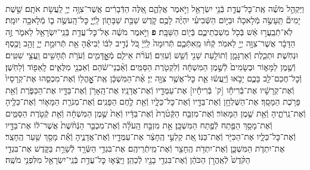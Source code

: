 \documentclass[twoside, openany, parskip=half, 11pt]{book}
\begin{document}
\begin{footnotesize}
\begin{multicols}{2}
\\
וַיַּקְהֵ֣ל מֹשֶׁ֗ה אֶֽת־כׇּל־עֲדַ֛ת בְּֿנֵ֥י יִשְׂרָאֵ֖ל וַיֹּ֣אמֶר אֲלֵהֶ֑ם אֵ֚לֶּה הַדְּֿבָרִ֔ים אֲשֶׁר־צִוָּ֥ה יְיָ֖ לַֽעֲשׂ֥ת אֹתָֽם׃ שֵׁ֣שֶׁת יָמִים֘ תֵּֽעָשֶׂ֣ה מְֿלָאכָה֒ וּבַיּ֣וֹם הַשְּֿׁבִיעִ֗י יִהְיֶ֨ה לָכֶ֥ם קֹ֛דֶשׁ שַׁבַּ֥ת שַׁבָּת֖וֹן לַֽיְֿיָ֑ כׇּל־הָֽעֹשֶׂ֥ה ב֛וֹ מְֿלָאכָ֖ה יוּמָֽת׃ לֹֽא־תְֿבַֽעֲר֣וּ אֵ֔שׁ בְּֿכֹ֖ל מֽשְׁבֹֽתֵיכֶ֑ם בְּֿי֖וֹם הַשַּׁבָּֽת׃ \textbf{פ}
וַיֹּ֣אמֶר מֹשֶׁ֔ה אֶל־כׇּל־עֲדַ֥ת בְּֿנֵֽי־יִשְׂרָאֵ֖ל לֵאמֹ֑ר זֶ֣ה הַדָּבָ֔ר אֲשֶׁר־צִוָּ֥ה יְיָ֖ לֵאמֹֽר׃ קְֿח֨וּ מֵֽאִתְּֿכֶ֤ם תְּֿרוּמָה֙ לַֽיְֿיָ֔ כֹּ֚ל נְֿדִ֣יב לִבּ֔וֹ יְֿבִיאֶ֕הָ אֵ֖ת תְּֿרוּמַ֣ת יְיָ֑ זָהָ֥ב וָכֶ֖סֶף וּנְחֹֽשֶׁת׃ וּתְכֵ֧לֶת וְֿאַרְגָּמָ֛ן וְֿתוֹלַ֥עַת שָׁנִ֖י וְֿשֵׁ֥שׁ וְֿעִזִּֽים׃ וְֿעֹרֹ֨ת אֵילִ֧ם מְֿאׇׇׇׇׇׇָדָּמִ֛ים וְֿעֹרֹ֥ת תְּֿחָשִׁ֖ים וַֽעֲצֵ֥י שִׁטִּֽים׃ וְֿשֶׁ֖מֶן לַמָּא֑וֹר וּבְשָׂמִים֙ לְֿשֶׁ֣מֶן הַמִּשְׁחָ֔ה וְֿלִקְטֹ֖רֶת הַסַּמִּֽים׃ וְֿאַ֨בְנֵי־שֹׁ֔הַם וְֿאַבְנֵ֖י מִלֻּאִ֑ים לָֽאֵפ֖וֹד וְֿלַחֹֽשֶׁן׃ וְֿכׇל־חֲכַם־לֵ֖ב בָּכֶ֑ם יָבֹ֣אוּ וְֿיַֽעֲשׂ֔וּ אֵ֛ת כׇּל־אֲשֶׁ֥ר צִוָּ֖ה יְיָ׃
אֶ֨ת־הַמִּשְׁכָּ֔ן אֶֽת־אׇׇׇׇׇָֽהֳל֖וֹ וְֿאֶת־מִכְסֵ֑הוּ אֶת־קְרָסָיו֙ וְֿאֶת־קְרָשָׁ֔יו אֶת־בְּֿרִיחָ֕ו [ק' בְּֿרִיחָ֕יו] אֶת־עַמֻּדָ֖יו וְֿאֶת־אֲדָנָֽיו׃ אֶת־הָֽאָרֹ֥ן וְֿאֶת־בַּדָּ֖יו אֶת־הַכַּפֹּ֑רֶת וְֿאֵ֖ת פָּרֹ֥כֶת הַמָּסָֽךְ׃ אֶת־הַשֻּׁלְחָ֥ן וְֿאֶת־בַּדָּ֖יו וְֿאֶת־כׇּל־כֵּלָ֑יו וְֿאֵ֖ת לֶ֥חֶם הַפָּנִֽים׃ וְֿאֶת־מְנֹרַ֧ת הַמָּא֛וֹר וְֿאֶת־כֵּלֶ֖יהָ וְֿאֶת־נֵֽרֹתֶ֑יהָ וְֿאֵ֖ת שֶׁ֥מֶן הַמָּאֽוֹר׃ וְֿאֶת־מִזְבַּ֤ח הַקְּֿטֹ֨רֶת֙ וְֿאֶת־בַּדָּ֔יו וְֿאֵת֙ שֶׁ֣מֶן הַמִּשְׁחָ֔ה וְֿאֵ֖ת קְֿטֹ֣רֶת הַסַּמִּ֑ים וְֿאֶת־מָסַ֥ךְ הַפֶּ֖תַח לְֿפֶ֥תַח הַמִּשְׁכָּֽן׃ אֵ֣ת מִזְבַּ֣ח הָֽעֹלָ֗ה וְֿאֶת־מִכְבַּ֤ר הַנְּֿחֹ֨שֶׁת֙ אֲשֶׁר־ל֔וֹ אֶת־בַּדָּ֖יו וְֿאֶת־כׇּל־כֵּלָ֑יו אֶת־הַכִּיֹּ֖ר וְֿאֶת־כַּנּֽוֹ׃ אֵ֚ת קַלְעֵ֣י הֶֽחָצֵ֔ר אֶת־עַמֻּדָ֖יו וְֿאֶת־אֲדָנֶ֑יהָ וְֿאֵ֕ת מָסַ֖ךְ שַׁ֥עַר הֶֽחָצֵֽר׃ אֶת־יִתְדֹ֧ת הַמִּשְׁכָּ֛ן וְֿאֶת־יִתְדֹ֥ת הֶֽחָצֵ֖ר וְֿאֶת־מֵֽיתְֿרֵיהֶֽם׃ אֶת־בִּגְדֵ֥י הַשְּֿׂרָ֖ד לְֿשָׁרֵ֣ת בַּקֹּ֑דֶשׁ אֶת־בִּגְדֵ֤י הַקֹּ֨דֶשׁ֙ לְֿאַֽהֲרֹ֣ן הַכֹּהֵ֔ן וְֿאֶת־בִּגְדֵ֥י בָנָ֖יו לְֿכַהֵֽן׃ וַיֵּֽצְֿא֛וּ כׇּל־עֲדַ֥ת בְּֿנֵֽי־יִשְׂרָאֵ֖ל מִלִּפְנֵ֥י מֹשֶֽׁה׃


\end{multicols}
\end{footnotesize}
\end{document}
